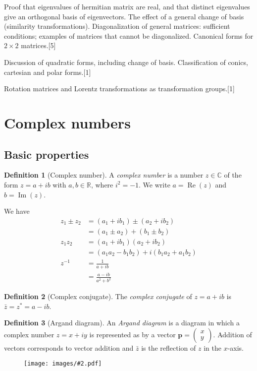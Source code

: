 \documentclass[a4paper]{article}
\theoremstyle{definition}
\newtheorem*{defi}{Definition}
\newcommand{\mb}[1]{\mathbf{#1}}
\newcommand{\R}{\mathbb{R}}
\newcommand{\C}{\mathbb{C}}
\DeclareMathOperator\im{Im}
\DeclareMathOperator\re{Re}
\newcommand{\img}[2][]{\begin{figure}[ht]\centering\texttt{[image: images/\#2.pdf]}\end{figure}}
\let\stdsection\section
\renewcommand\section{\newpage\stdsection}
\begin{document}
{\vspace{5pt}
\noindent Proof that eigenvalues of hermitian matrix are real, and that distinct eigenvalues give an orthogonal basis of eigenvectors. The effect of a general change of basis (similarity transformations). Diagonalization of general matrices: sufficient conditions; examples of matrices that cannot be diagonalized. Canonical forms for $2 \times 2$ matrices.\hspace*{\fill}[5]

\vspace{5pt}
\noindent Discussion of quadratic forms, including change of basis. Classification of conics, cartesian and polar forms.\hspace*{\fill}[1]

\vspace{5pt}
\noindent Rotation matrices and Lorentz transformations as transformation groups.\hspace*{\fill}[1]}

\tableofcontents
\newpage
\section{Complex numbers}
\subsection{Basic properties}
\begin{defi}[Complex number]
  A \emph{complex number} is a number $z\in \C$ of the form $z = a + ib$ with $a, b\in \R$, where $i^2=-1$. We write $a = \re(z)$ and $b = \im(z)$.
\end{defi}

We have
\begin{align*}
  z_1\pm z_2 &= (a_1 + ib_1)\pm (a_2 + ib_2)\\
  &= (a_1\pm a_2) + (b_1 \pm b_2)\\
  z_1z_2 &= (a_1 + ib_1)(a_2 + ib_2)\\
  &= (a_1a_2 - b_1b_2) + i(b_1a_2 + a_1b_2)\\
  z^{-1} &= \frac{1}{a + ib}\\
  &= \frac{a - ib}{a^2 + b^2}
\end{align*}
\begin{defi}[Complex conjugate]
  The \emph{complex conjugate} of $z = a+ ib$ is $\bar{z} = z^* = a - ib$.
\end{defi}

\begin{defi}[Argand diagram]
  An \emph{Argand diagram} is a diagram in which a complex number $z = x + iy$ is represented as by a vector $\mb{p}=\begin{pmatrix}x\\y\end{pmatrix}$. Addition of vectors corresponds to vector addition and $\bar{z}$ is the reflection of $z$ in the $x$-axis.
\end{defi}
\img{vm_1}
\end{document}
